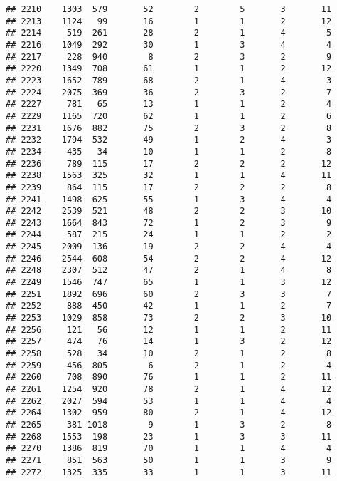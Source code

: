 \documentclass[]{article}
\begin{document}
\begin{verbatim}
## 2210    1303  579       52        2        5       3       11
## 2213    1124   99       16        1        1       2       12
## 2214     519  261       28        2        1       4        5
## 2216    1049  292       30        1        3       4        4
## 2217     228  940        8        2        3       2        9
## 2220    1349  708       61        1        1       2       12
## 2223    1652  789       68        2        1       4        3
## 2224    2075  369       36        2        3       2        7
## 2227     781   65       13        1        1       2        4
## 2229    1165  720       62        1        1       2        6
## 2231    1676  882       75        2        3       2        8
## 2232    1794  532       49        1        2       4        3
## 2234     435   34       10        1        1       2        8
## 2236     789  115       17        2        2       2       12
## 2238    1563  325       32        1        1       4       11
## 2239     864  115       17        2        2       2        8
## 2241    1498  625       55        1        3       4        4
## 2242    2539  521       48        2        2       3       10
## 2243    1664  843       72        1        2       3        9
## 2244     587  215       24        1        1       2        2
## 2245    2009  136       19        2        2       4        4
## 2246    2544  608       54        2        2       4       12
## 2248    2307  512       47        2        1       4        8
## 2249    1546  747       65        1        1       3       12
## 2251    1892  696       60        2        3       3        7
## 2252     888  450       42        1        1       2        7
## 2253    1029  858       73        2        2       3       10
## 2256     121   56       12        1        1       2       11
## 2257     474   76       14        1        3       2       12
## 2258     528   34       10        2        1       2        8
## 2259     456  805        6        2        1       2        4
## 2260     708  890       76        1        1       2       11
## 2261    1254  920       78        2        1       4       12
## 2262    2027  594       53        1        1       4        4
## 2264    1302  959       80        2        1       4       12
## 2265     381 1018        9        1        3       2        8
## 2268    1553  198       23        1        3       3       11
## 2270    1386  819       70        1        1       4        4
## 2271     851  563       50        1        1       3        9
## 2272    1325  335       33        1        1       3       11

\end{verbatim}
\end{document}
